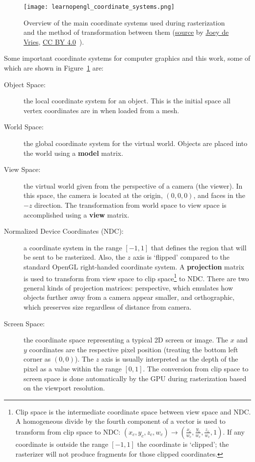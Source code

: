 \begin{figure}[h]
\centering
\texttt{[image: learnopengl\_coordinate\_systems.png]}
\caption{Overview of the main coordinate systems used during rasterization and the method of transformation between them (\href{https://learnopengl.com/img/getting-started/coordinate_systems.png}{source} by \href{https://twitter.com/JoeyDeVriez}{Joey de Vries}, \href{https://creativecommons.org/licenses/by/4.0/}{CC BY 4.0}~\cite{learnopengl}).}
\label{fig:coordinate_systems}
\end{figure}

Some important coordinate systems for computer graphics and this work, some of which are shown in Figure~\ref{fig:coordinate_systems} are:
\begin{description}
    \item[Object Space:] the local coordinate system for an object. This is the initial space all vertex coordinates are in when loaded from a mesh.
    \item[World Space:] the global coordinate system for the virtual world. Objects are placed into the world using a \textbf{model} matrix.
    \item[View Space:] the virtual world given from the perspective of a camera (the viewer). In this space, the camera is located at the origin, $(0,0,0)$, and faces in the $-z$ direction. The transformation from world space to view space is accomplished using a \textbf{view} matrix.
    \item[Normalized Device Coordinates (NDC):] a coordinate system in the range $[-1, 1]$ that defines the region that will be sent to be rasterized. Also, the $z$ axis is `flipped' compared to the standard OpenGL right-handed coordinate system. A \textbf{projection} matrix is used to transform from view space to clip space\footnote{Clip space is the intermediate coordinate space between view space and NDC. A homogeneous divide by the fourth component of a vector is used to transform from clip space to NDC: $(x_c, y_c, z_c, w_c) \rightarrow (\frac{x_c}{w_c}, \frac{y_c}{w_c}, \frac{z_c}{w_c}, 1)$. If any coordinate is outside the range $[-1, 1]$ the coordinate is `clipped'; the rasterizer will not produce fragments for those clipped coordinates. } to NDC. There are two general kinds of projection matrices: perspective, which emulates how objects further away from a camera appear smaller, and orthographic, which preserves size regardless of distance from camera.
    \item[Screen Space:] the coordinate space representing a typical 2D screen or image. The $x$ and $y$ coordinates are the respective pixel position (treating the bottom left corner as $(0,0)$). The $z$ axis is usually interpreted as the depth of the pixel as a value within the range $[0, 1]$. The conversion from clip space to screen space is done automatically by the GPU during rasterization based on the viewport resolution.

\end{description}
